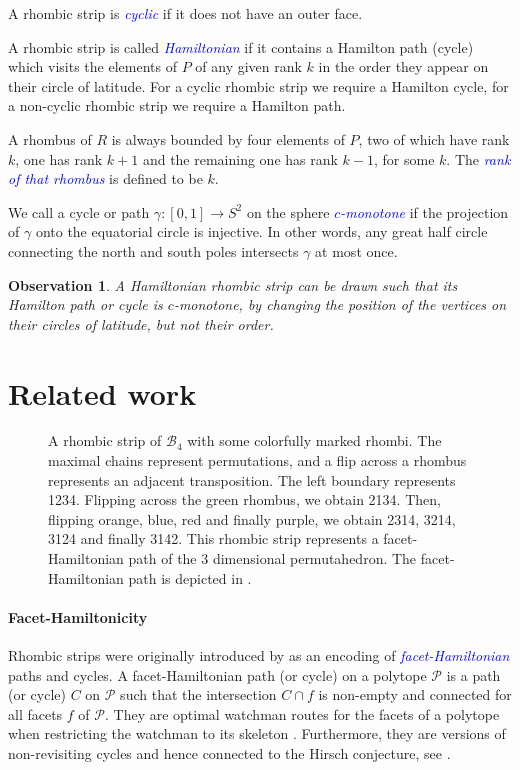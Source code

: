 \documentclass[fontsize=11pt,a4paper,DIV=12]{scrartcl}
\newcommand{\defn}[1]{\textsl{\textcolor{Blue}{#1}}}
\newtheorem{observation}[theorem]{Observation}
\begin{document}
A rhombic strip is \defn{cyclic} if it does not have an outer face.

A rhombic strip is called \defn{Hamiltonian} if it contains a Hamilton path (cycle) which visits the elements of $P$ of any given rank $k$ in the order they appear on their circle of latitude. For a cyclic rhombic strip we require a Hamilton cycle, for a non-cyclic rhombic strip we require a Hamilton path.

A rhombus of $R$ is always bounded by four elements of $P$, two of which have rank $k$, one has rank $k+1$ and the remaining one has rank $k-1$, for some $k$. The \defn{rank of that rhombus} is defined to be $k$.

We call a cycle or path $\gamma\colon[0,1]\to S^2$ on the sphere \defn{$c$-monotone} if the projection of $\gamma$ onto the equatorial circle is injective. In other words, any great half circle connecting the north and south poles intersects $\gamma$ at most once.
\begin{observation}
    A Hamiltonian rhombic strip can be drawn such that its Hamilton path or cycle is $c$-monotone, by changing the position of the vertices on their circles of latitude, but not their order.
\end{observation}

\section{Related work}\label{sec:related}

\begin{figure}
    \centering
    
    \caption{A rhombic strip of $\mathcal B_4$ with some colorfully marked rhombi. The maximal chains represent permutations, and a flip across a rhombus represents an adjacent transposition. The left boundary represents 1234. Flipping across the green rhombus, we obtain 2134. Then, flipping orange, blue, red and finally purple, we obtain 2314, 3214, 3124 and finally 3142. This rhombic strip represents a facet-Hamiltonian path of the 3 dimensional permutahedron. The facet-Hamiltonian path is depicted in .}
    \label{fig:rhombic to fh example}
\end{figure}

\paragraph{Facet-Hamiltonicity}
Rhombic strips were originally introduced by \textcite{facethamiltonicity} as an encoding of \defn{facet-Hamiltonian} paths and cycles. A facet-Hamiltonian path (or cycle) on a polytope $\mathcal P$ is a path (or cycle) $C$ on $\mathcal P$ such that the intersection $C\cap f$ is non-empty and connected for all facets $f$ of $\mathcal P$. They are optimal watchman routes for the facets of a polytope when restricting the watchman to its skeleton \cite{watchmanChin, watchmanLines, watchmanSimple, watchmanApproximation}. Furthermore, they are versions of non-revisiting cycles and hence connected to the Hirsch conjecture, see \cite{non-revisiting1, non-revisiting2, non-revisiting3, non-revisiting4, non-revisiting5}.
\end{document}
